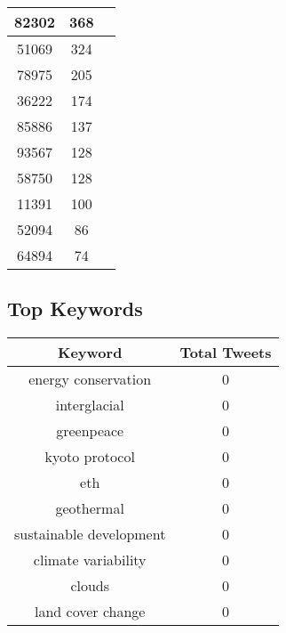\documentclass{article}\usepackage[T1]{fontenc}
\begin{document}
\begin{tabular}{|c|c|c|}
 \hline
82302 & 368\\ 
 \hline
51069 & 324\\ 
 \hline
78975 & 205\\ 
 \hline
36222 & 174\\ 
 \hline
85886 & 137\\ 
 \hline
93567 & 128\\ 
 \hline
58750 & 128\\ 
 \hline
11391 & 100\\ 
 \hline
52094 & 86\\ 
 \hline
64894 & 74\\ 
 \hline
\end{tabular}\subsection*{Top Keywords}\begin{tabular}{|c|c|}         \hline         Keyword & Total Tweets \\ 
 \hline
energy conservation & 0\\ 
 \hline
interglacial & 0\\ 
 \hline
greenpeace & 0\\ 
 \hline
kyoto protocol & 0\\ 
 \hline
eth & 0\\ 
 \hline
geothermal & 0\\ 
 \hline
sustainable development & 0\\ 
 \hline
climate variability & 0\\ 
 \hline
clouds & 0\\ 
 \hline
land cover change & 0\\ 
 \hline
\end{tabular}
\end{document}
